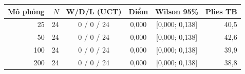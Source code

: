\begin{tabular}{r r c c c r}
\toprule
Mô phỏng & $N$ & W/D/L (UCT) & Điểm & Wilson 95\% & Plies TB \\
\midrule
25 & 24 & 0 / 0 / 24 & 0,000 & {[0,000; 0,138]} & 40,5 \\
50 & 24 & 0 / 0 / 24 & 0,000 & {[0,000; 0,138]} & 42,6 \\
100 & 24 & 0 / 0 / 24 & 0,000 & {[0,000; 0,138]} & 39,9 \\
200 & 24 & 0 / 0 / 24 & 0,000 & {[0,000; 0,138]} & 38,8 \\
\bottomrule
\end{tabular}
